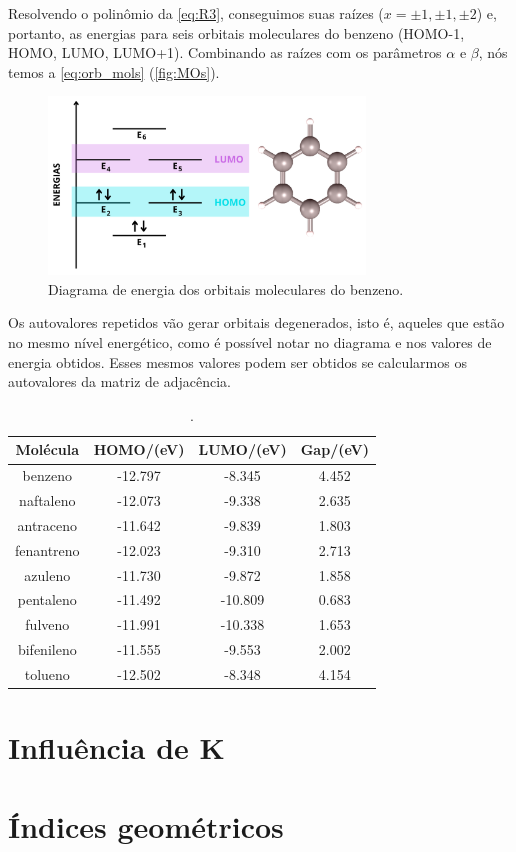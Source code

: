 Resolvendo o polinômio da \autoref{eq:R3}, conseguimos suas raízes ($x = \pm 1, \pm 1, \pm 2$) e, portanto, as energias para seis orbitais moleculares do benzeno (HOMO-1, HOMO, LUMO, LUMO+1). Combinando as raízes com os parâmetros $\alpha$ e $\beta$, nós temos a \autoref{eq:orb_mols} (\autoref{fig:MOs}).

\begin{figure}[htb]
\caption{\label{fig:MOs} Diagrama de energia dos orbitais moleculares do benzeno.}
	\begin{center}
		\includegraphics[width=0.75\textwidth]{images/MOs.png}
	\end{center}
\end{figure}

Os autovalores repetidos vão gerar orbitais degenerados, isto é, aqueles que estão no mesmo nível energético, como é possível notar no diagrama e nos valores de energia obtidos. Esses mesmos valores podem ser obtidos se calcularmos os autovalores da matriz de adjacência.

\begin{table}[htb]
	\centering
	\caption{\label{qua:Quadro_1} .}	
	\begin{tabular}{cccc}
		\toprule
		\textbf{Molécula} & \textbf{HOMO/(eV)} & \textbf{LUMO/(eV)} & \textbf{Gap/(eV)}
		\\ 
		\midrule
        benzeno & -12.797 & -8.345 & 4.452 \\
        naftaleno & -12.073 & -9.338 & 2.635 \\
        antraceno & -11.642 & -9.839 & 1.803 \\
        fenantreno & -12.023 & -9.310 & 2.713 \\
        azuleno & -11.730 & -9.872 & 1.858 \\
        pentaleno & -11.492 & -10.809 & 0.683 \\
        fulveno & -11.991 & -10.338 & 1.653 \\
        bifenileno & -11.555 & -9.553 & 2.002 \\
        tolueno & -12.502 & -8.348 & 4.154 \\
    \bottomrule
	\end{tabular}
\end{table}

\section{Influência de K}


\section{Índices geométricos}